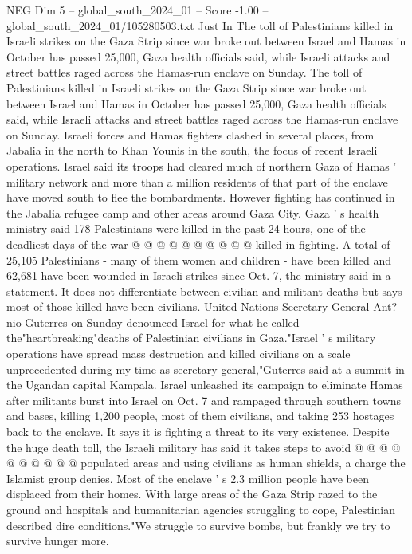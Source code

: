 \begin{textsample}{NEG Dim 5 – global\_south\_2024\_01 – Score -1.00 – global\_south\_2024\_01/105280503.txt}  \label{ex:f5_neg_441}
Just In The toll of Palestinians killed in Israeli strikes on the Gaza Strip since war broke out between Israel and Hamas in October has passed 25,000, Gaza health officials said, while Israeli attacks and street battles raged across the Hamas-run enclave on Sunday.
The toll of Palestinians killed in Israeli strikes on the Gaza Strip since war broke out between Israel and Hamas in October has passed 25,000, Gaza health officials said, while Israeli attacks and street battles raged across the Hamas-run enclave on Sunday.
Israeli forces and Hamas fighters clashed in several places, from Jabalia in the north to Khan Younis in the south, the focus of recent Israeli operations.
Israel said its troops had cleared much of northern Gaza of Hamas ' military network and more than a million residents of that part of the enclave have moved south to flee the bombardments.
However fighting has continued in the Jabalia refugee camp and other areas around Gaza City.
Gaza ' s health ministry said 178 Palestinians were killed in the past 24 hours, one of the deadliest days of the war @ @ @ @ @ @ @ @ @ @ killed in fighting.
A total of 25,105 Palestinians - many of them women and children - have been killed and 62,681 have been wounded in Israeli strikes since Oct. 7, the ministry said in a statement.
It does not differentiate between civilian and militant deaths but says most of those killed have been civilians.
United Nations Secretary-General Ant? nio Guterres on Sunday denounced Israel for what he called the"heartbreaking"deaths of Palestinian civilians in Gaza."Israel ' s military operations have spread mass destruction and killed civilians on a scale unprecedented during my time as secretary-general,"Guterres said at a summit in the Ugandan capital Kampala.
Israel unleashed its campaign to eliminate Hamas after militants burst into Israel on Oct. 7 and rampaged through southern towns and bases, killing 1,200 people, most of them civilians, and taking 253 hostages back to the enclave.
It says it is fighting a threat to its very existence.
Despite the huge death toll, the Israeli military has said it takes steps to avoid @ @ @ @ @ @ @ @ @ @ populated areas and using civilians as human shields, a charge the Islamist group denies.
Most of the enclave ' s 2.3 million people have been displaced from their homes.
With large areas of the Gaza Strip razed to the ground and hospitals and humanitarian agencies struggling to cope, Palestinian described dire conditions."We struggle to survive bombs, but frankly we try to survive hunger more.

\end{textsample}

